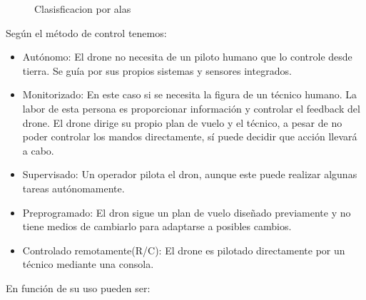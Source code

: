 \begin{figure}[H]
\centering
{}
\caption{Clasisficacion por alas}
\end{figure}

Según el método de control tenemos:

\begin{itemize}
\item Autónomo: El drone no necesita de un piloto humano que lo controle desde tierra. Se guía por sus propios sistemas y sensores integrados. 
\item Monitorizado: En este caso si se necesita la figura de un técnico humano. La labor de esta persona es proporcionar información y controlar el feedback del drone. El drone dirige su propio plan de vuelo y el técnico, a pesar de no poder controlar los mandos directamente, sí puede decidir que acción llevará a cabo.
\item Supervisado: Un operador pilota el dron, aunque este puede realizar algunas tareas autónomamente.
\item Preprogramado: El dron sigue un plan de vuelo diseñado previamente y no tiene medios de cambiarlo para adaptarse a posibles cambios.
\item Controlado remotamente(R/C): El drone es pilotado directamente por un técnico mediante una consola.
\end{itemize}

En función de su uso pueden ser:

